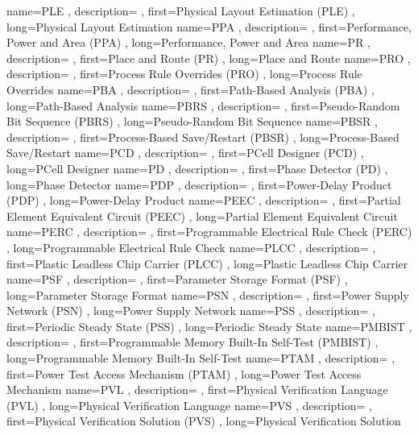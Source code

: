 { name={PLE}
, description={}
, first={Physical Layout Estimation (PLE)}
, long={Physical Layout Estimation}
}
{ name={PPA}
, description={}
, first={Performance, Power and Area (PPA)}
, long={Performance, Power and Area}
}
{ name={PR}
, description={}
, first={Place and Route (PR)}
, long={Place and Route}
}
{ name={PRO}
, description={}
, first={Process Rule Overrides (PRO)}
, long={Process Rule Overrides}
}
{ name={PBA}
, description={}
, first={Path-Based Analysis (PBA)}
, long={Path-Based Analysis}
}
{ name={PBRS}
, description={}
, first={Pseudo-Random Bit Sequence (PBRS)}
, long={Pseudo-Random Bit Sequence}
}
{ name={PBSR}
, description={}
, first={Process-Based Save/Restart (PBSR)}
, long={Process-Based Save/Restart}
}
{ name={PCD}
, description={}
, first={PCell Designer (PCD)}
, long={PCell Designer}
}
{ name={PD}
, description={}
, first={Phase Detector (PD)}
, long={Phase Detector}
}
{ name={PDP}
, description={}
, first={Power-Delay Product (PDP)}
, long={Power-Delay Product}
}
{ name={PEEC}
, description={}
, first={Partial Element Equivalent Circuit (PEEC)}
, long={Partial Element Equivalent Circuit}
}
{ name={PERC}
, description={}
, first={Programmable Electrical Rule Check (PERC)}
, long={Programmable Electrical Rule Check}
}
{ name={PLCC}
, description={}
, first={Plastic Leadless Chip Carrier (PLCC)}
, long={Plastic Leadless Chip Carrier}
}
{ name={PSF}
, description={}
, first={Parameter Storage Format (PSF)}
, long={Parameter Storage Format}
}
{ name={PSN}
, description={}
, first={Power Supply Network (PSN)}
, long={Power Supply Network}
}
{ name={PSS}
, description={}
, first={Periodic Steady State (PSS)}
, long={Periodic Steady State}
}
{ name={PMBIST}
, description={}
, first={Programmable Memory Built-In Self-Test (PMBIST)}
, long={Programmable Memory Built-In Self-Test}
}
{ name={PTAM}
, description={}
, first={Power Test Access Mechanism (PTAM)}
, long={Power Test Access Mechanism}
}
{ name={PVL}
, description={}
, first={Physical Verification Language (PVL)}
, long={Physical Verification Language}
}
{ name={PVS}
, description={}
, first={Physical Verification Solution (PVS)}
, long={Physical Verification Solution}
}
